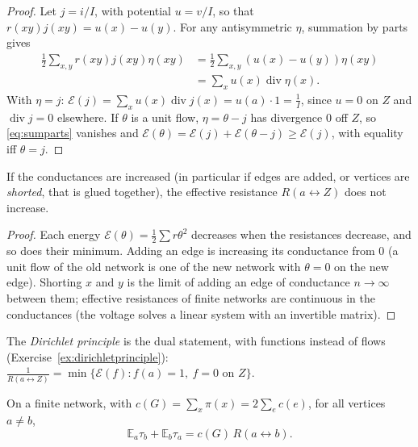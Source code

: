 \begin{proof}
Let $j=i/I$, with potential $u=v/I$, so that $r(xy)j(xy)=u(x)-u(y)$. For any antisymmetric $\eta$, summation by parts gives
\begin{equation}\label{eq:sumparts}
\begin{aligned}
\frac12\sum_{x,y}r(xy)j(xy)\eta(xy)&=\frac12\sum_{x,y}(u(x)-u(y))\eta(xy)\\
&=\sum_xu(x)\operatorname{div}\eta(x).
\end{aligned}
\end{equation}
With $\eta=j$: $\mathcal E(j)=\sum_xu(x)\operatorname{div}j(x)=u(a)\cdot1=\frac1I$, since $u=0$ on $Z$ and $\operatorname{div}j=0$ elsewhere. If $\theta$ is a unit flow, $\eta=\theta-j$ has divergence $0$ off $Z$, so \eqref{eq:sumparts} vanishes and
$\mathcal E(\theta)=\mathcal E(j)+\mathcal E(\theta-j)\ge\mathcal E(j)$, with equality iff $\theta=j$.
\end{proof}

\begin{corollary}\label{cor:rayleigh}
If the conductances are increased (in particular if edges are added, or vertices are \emph{shorted}, that is glued together), the effective resistance $R(a\leftrightarrow Z)$ does not increase.
\end{corollary}

\begin{proof}
Each energy $\mathcal E(\theta)=\frac12\sum r\theta^2$ decreases when the resistances decrease, and so does their minimum. Adding an edge is increasing its conductance from $0$ (a unit flow of the old network is one of the new
network with $\theta=0$ on the new edge). Shorting $x$ and $y$ is the limit of adding an edge of conductance $n\to\infty$ between them; effective resistances of finite networks are continuous in the conductances (the
voltage solves a linear system with an invertible matrix).
\end{proof}

The \emph{Dirichlet principle} is the dual statement, with functions instead of flows (Exercise~\ref{ex:dirichletprinciple}): $\frac1{R(a\leftrightarrow Z)}=\min\{\mathcal E(f):f(a)=1,\ f=0\text{ on }Z\}$.

\begin{theorem}\label{thm:commute}
On a finite network, with $c(G)=\sum_x\pi(x)=2\sum_ec(e)$, for all vertices $a\ne b$,
\[
\mathbb E_a\tau_b+\mathbb E_b\tau_a=c(G)\,R(a\leftrightarrow b) .
\]
\end{theorem}

